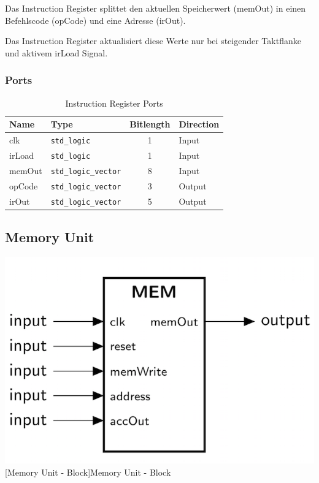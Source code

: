 Das Instruction Register splittet den aktuellen Speicherwert (memOut) in einen Befehlscode (opCode) und eine Adresse (irOut).

Das Instruction Register aktualisiert diese Werte nur bei steigender Taktflanke und aktivem irLoad Signal.

\subsubsection{Ports}

\vspace{1em}
\begin{table}[!h]
	\centering
	\begin{tabular}{|l|l|c|l|}
		\hline
		\textbf{Name} & \textbf{Type} & \textbf{Bitlength} & \textbf{Direction}\\
		\hline
		clk & \texttt{std\_logic} & 1 & Input \\
		\hline
		irLoad & \texttt{std\_logic} & 1 & Input \\
		\hline
		memOut & \texttt{std\_logic\_vector} & 8 & Input \\
		\hline
		opCode & \texttt{std\_logic\_vector} & 3 & Output \\
		\hline
		irOut & \texttt{std\_logic\_vector} & 5 & Output \\
		\hline
	\end{tabular}
	\caption{Instruction Register Ports}
	\label{tab:ir_ports}
\end{table}


\pagebreak
\subsection{Memory Unit}

\vspace{1em}
\begin{minipage}{\linewidth}
    \centering
    \includegraphics[width=0.4\linewidth]{images/MEM.png}\\
    [Memory Unit - Block]{Memory Unit - Block}
    \label{fig:mem_block}
\end{minipage}

